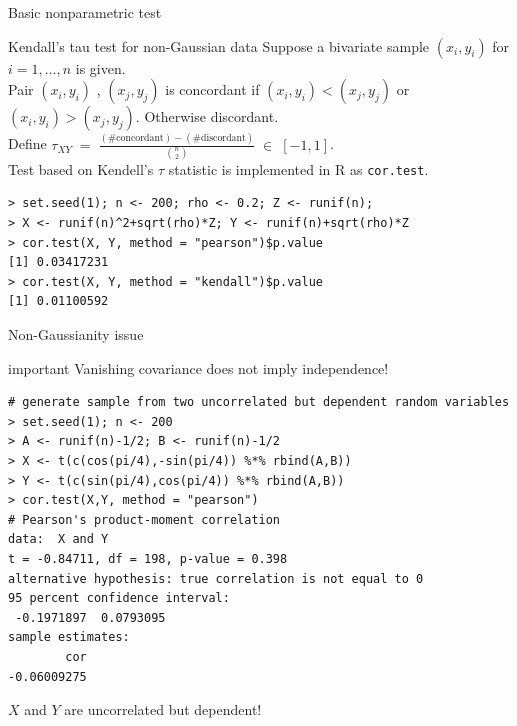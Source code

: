 \documentclass[11pt,handout,aspectratio=169,dvipsnames]{beamer}
\begin{document}
\begin{frame}[fragile,label=tau]{Basic nonparametric test}
\begin{block}{Kendall's tau test for non-Gaussian data}
Suppose a bivariate sample $(x_i,y_i)$ for $i=1,\ldots,n$ is given.\\[.2cm]
Pair $(x_i,y_i)$ , $(x_j,y_j)$ is \alert{concordant} if $(x_i,y_i)< (x_j,y_j)$ or $(x_i,y_i)> (x_j,y_j)$. Otherwise  \alert{discordant}.\\[.2cm]
Define $\tau_{XY}\;=\;\tfrac{(\#\mbox{concordant})-(\#\mbox{discordant})}{{n\choose 2}}\;\in\;  [-1,1]$.\\[.2cm]
Test based on Kendell's $\tau$ statistic is implemented in \textsc{R} as \texttt{cor.test}.
   \begin{lstlisting}
> set.seed(1); n <- 200; rho <- 0.2; Z <- runif(n); 
> X <- runif(n)^2+sqrt(rho)*Z; Y <- runif(n)+sqrt(rho)*Z
> cor.test(X, Y, method = "pearson")$p.value
[1] 0.03417231
> cor.test(X, Y, method = "kendall")$p.value
[1] 0.01100592
 \end{lstlisting}
\end{block}
\end{frame}


\begin{frame}[fragile]{Non-Gaussianity issue}
\begin{beamercolorbox}[wd=\paperwidth,sep=5pt]{important}
Vanishing covariance does not imply independence!
\end{beamercolorbox}
\begin{lstlisting}
# generate sample from two uncorrelated but dependent random variables
> set.seed(1); n <- 200
> A <- runif(n)-1/2; B <- runif(n)-1/2
> X <- t(c(cos(pi/4),-sin(pi/4)) %*% rbind(A,B))
> Y <- t(c(sin(pi/4),cos(pi/4)) %*% rbind(A,B))
> cor.test(X,Y, method = "pearson")
# Pearson's product-moment correlation
data:  X and Y
t = -0.84711, df = 198, p-value = 0.398
alternative hypothesis: true correlation is not equal to 0
95 percent confidence interval:
 -0.1971897  0.0793095
sample estimates:
        cor 
-0.06009275 \end{lstlisting}
$X$ and $Y$ are uncorrelated but dependent!
\end{frame}
\end{document}
